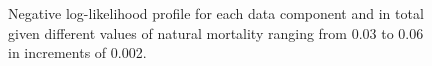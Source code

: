 \documentclass[
]{scrartcl}
\begin{document}
\begin{figure}


\caption{\label{fig-natm-piner}Negative log-likelihood profile for each
data component and in total given different values of natural mortality
ranging from 0.03 to 0.06 in increments of 0.002.}

\end{figure}%

\clearpage
\end{document}

